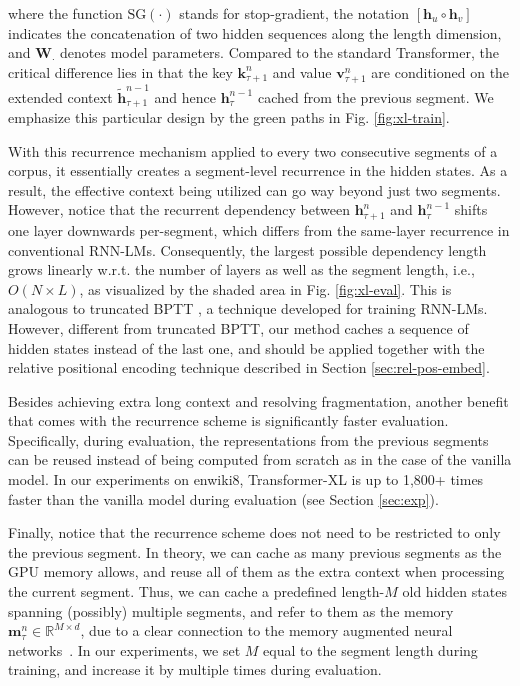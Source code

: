 \documentclass[11pt,a4paper]{article}
\def\rvh{{\mathbf{h}}}
\def\rvk{{\mathbf{k}}}
\def\rvm{{\mathbf{m}}}
\def\rvv{{\mathbf{v}}}
\newcommand{\R}{\mathbb{R}}
\begin{document}
\noindent where the function $\text{SG}(\cdot)$ stands for stop-gradient, the notation $[\rvh_u \circ \rvh_v]$ indicates the concatenation of two hidden sequences along the length dimension, and $\mathbf{W}_\cdot$ denotes model parameters.
Compared to the standard Transformer, the critical difference lies in that the key $\rvk_{\tau+1}^{n}$ and value $\rvv_{\tau+1}^{n}$ are conditioned on the extended context $\widetilde{\rvh}_{\tau+1}^{n-1}$ and hence $\rvh_{\tau}^{n-1}$ cached from the previous segment.
We emphasize this particular design by the green paths in Fig. \ref{fig:xl-train}.

With this recurrence mechanism applied to every two consecutive segments of a corpus, it essentially creates a segment-level recurrence in the hidden states.
As a result, the effective context being utilized can go way beyond just two segments.
However, notice that the recurrent dependency between $\rvh_{\tau+1}^{n}$ and $\rvh_{\tau}^{n-1}$ shifts one layer downwards per-segment, which differs from the same-layer recurrence in conventional RNN-LMs.
Consequently, the largest possible dependency length grows linearly w.r.t. the number of layers as well as the segment length, i.e., $O(N \times L)$, as visualized by the shaded area in Fig. \ref{fig:xl-eval}.
This is analogous to truncated BPTT \citep{mikolov2010recurrent}, a technique developed for training RNN-LMs. However, different from truncated BPTT, our method caches a sequence of hidden states instead of the last one, and should be applied together with the relative positional encoding technique described in Section \ref{sec:rel-pos-embed}.

Besides achieving extra long context and resolving fragmentation, another benefit that comes with the recurrence scheme is significantly faster evaluation.
Specifically, during evaluation, the representations from the previous segments can be reused instead of being computed from scratch as in the case of the vanilla model.
In our experiments on enwiki8, Transformer-XL is up to 1,800+ times faster than the vanilla model during evaluation (see Section \ref{sec:exp}).



Finally, notice that the recurrence scheme does not need to be restricted to only the previous segment.
In theory, we can cache as many previous segments as the GPU memory allows, and reuse all of them as the extra context when processing the current segment.
Thus, we can cache a predefined length-$M$ old hidden states spanning (possibly) multiple segments, and refer to them as the memory $\rvm_{\tau}^{n} \in \R^{M \times d}$, due to a clear connection to the memory augmented neural networks~\citep{graves2014neural,weston2014memory}.
In our experiments, we set $M$ equal to the segment length during training, and increase it by multiple times during evaluation.
\end{document}
